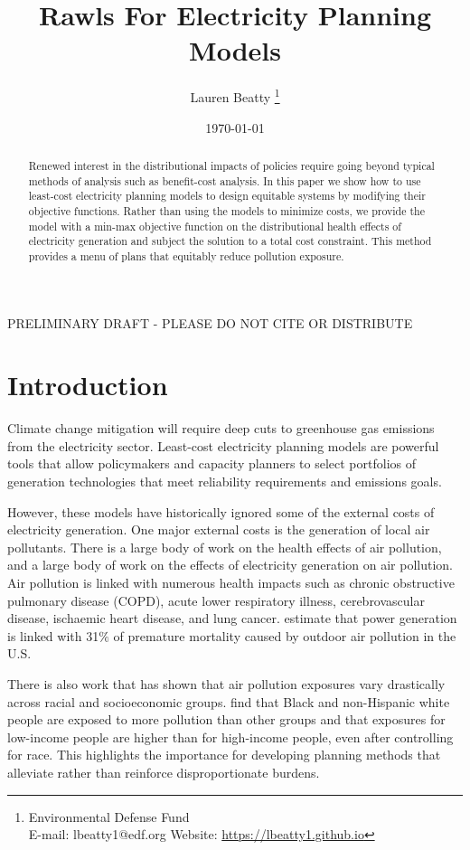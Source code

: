 \documentclass[a4paper]{article}
\title{Rawls For Electricity Planning Models}
\author{Lauren Beatty \thanks{Environmental Defense Fund\\  E-mail: lbeatty1@edf.org \hspace{.5cm}Website: \href{https://lbeatty1.github.io}{https://lbeatty1.github.io}}}
\date{\today}
\theoremstyle{definition}
\theoremstyle{plain}
\begin{document}
\maketitle
\begin{center}
    PRELIMINARY DRAFT - PLEASE DO NOT CITE OR DISTRIBUTE
\end{center}

\begin{abstract}
Renewed interest in the distributional impacts of policies require going beyond typical methods of analysis such as benefit-cost analysis.  In this paper we show how to use least-cost electricity planning models to design equitable systems by modifying their objective functions.  Rather than using the models to minimize costs, we provide the model with a min-max objective function on the distributional health effects of electricity generation and subject the solution to a total cost constraint.  This method provides a menu of plans that equitably reduce pollution exposure.
\end{abstract}


\newpage
\section{Introduction}
Climate change mitigation will require deep cuts to greenhouse gas emissions from the electricity sector.  Least-cost electricity planning models are powerful tools that allow policymakers and capacity planners to select portfolios of generation technologies that meet reliability requirements and emissions goals.  

However, these models have historically ignored some of the external costs of electricity generation. 
 One major external costs is the generation of local air pollutants.  There is a large body of work on the health effects of air pollution, and a large body of work on the effects of electricity generation on air pollution. 
Air pollution is linked with numerous health impacts such as chronic obstructive pulmonary disease (COPD), acute lower respiratory illness, cerebrovascular disease, ischaemic heart disease, and lung cancer. \cite{Lelieveld2015TheScale} estimate that power generation is linked with 31$\%$ of premature mortality caused by outdoor air pollution in the U.S.

There is also work that has shown that air pollution exposures vary drastically across racial and socioeconomic groups.   \cite{Thind2019FineGeography} find that Black and non-Hispanic white people are exposed to more pollution than other groups and that exposures for low-income people are higher than for high-income people, even after controlling for race.  This highlights the importance for developing planning methods that alleviate rather than reinforce disproportionate burdens.
\end{document}
